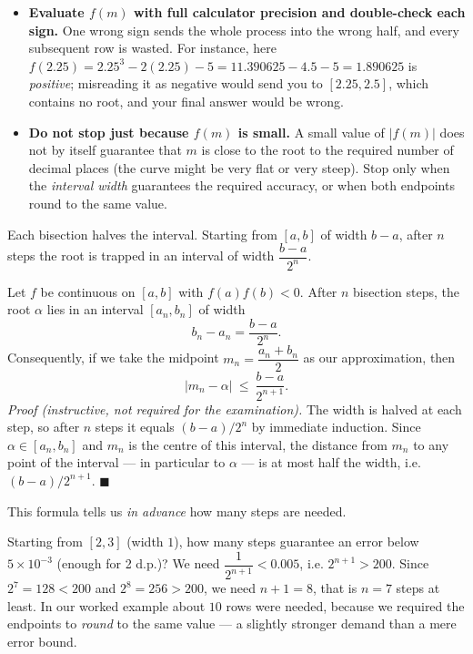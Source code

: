 \documentclass[11pt]{article}
\newcounter{popsec}
\newcounter{popsub}
\newcommand{\courssub}[1]{%
  \stepcounter{popsub}%
  \par\vspace{9pt}\noindent{\popxbold\fontsize{11.5}{13}\selectfont\color{popink}{\color{poporange}\thepopsec.\thepopsub}\hspace{6pt}#1}\par\nopagebreak\vspace{4pt}
}
\begin{document}
\begin{attention}
\begin{itemize}
\item \textbf{Evaluate $f(m)$ with full calculator precision and double-check each sign.} One wrong sign sends the whole process into the wrong half, and every subsequent row is wasted. For instance, here $f(2.25)=2.25^3-2(2.25)-5=11.390625-4.5-5=1.890625$ is \emph{positive}; misreading it as negative would send you to $[2.25,2.5]$, which contains no root, and your final answer would be wrong.
\item \textbf{Do not stop just because $f(m)$ is small.} A small value of $|f(m)|$ does not by itself guarantee that $m$ is close to the root to the required number of decimal places (the curve might be very flat or very steep). Stop only when the \emph{interval width} guarantees the required accuracy, or when both endpoints round to the same value.
\end{itemize}
\end{attention}

\courssub{Error bound and number of steps}

Each bisection halves the interval. Starting from $[a,b]$ of width $b-a$, after $n$ steps the root is trapped in an interval of width $\dfrac{b-a}{2^n}$.

\begin{propriete}
Let $f$ be continuous on $[a,b]$ with $f(a)f(b)<0$. After $n$ bisection steps, the root $\alpha$ lies in an interval $[a_n,b_n]$ of width
\[ b_n-a_n=\frac{b-a}{2^n}. \]
Consequently, if we take the midpoint $m_n=\dfrac{a_n+b_n}{2}$ as our approximation, then
\[ |m_n-\alpha|\ \le\ \frac{b-a}{2^{n+1}}. \]
\emph{Proof (instructive, not required for the examination).} The width is halved at each step, so after $n$ steps it equals $(b-a)/2^n$ by immediate induction. Since $\alpha\in[a_n,b_n]$ and $m_n$ is the centre of this interval, the distance from $m_n$ to any point of the interval --- in particular to $\alpha$ --- is at most half the width, i.e. $(b-a)/2^{n+1}$. $\blacksquare$
\end{propriete}

This formula tells us \emph{in advance} how many steps are needed.

\begin{exemplebox}
Starting from $[2,3]$ (width $1$), how many steps guarantee an error below $5\times10^{-3}$ (enough for 2 d.p.)?
We need $\dfrac{1}{2^{n+1}}<0.005$, i.e. $2^{n+1}>200$. Since $2^7=128<200$ and $2^8=256>200$, we need $n+1=8$, that is $n=7$ steps at least. In our worked example about $10$ rows were needed, because we required the endpoints to \emph{round} to the same value --- a slightly stronger demand than a mere error bound.
\end{exemplebox}
\end{document}
